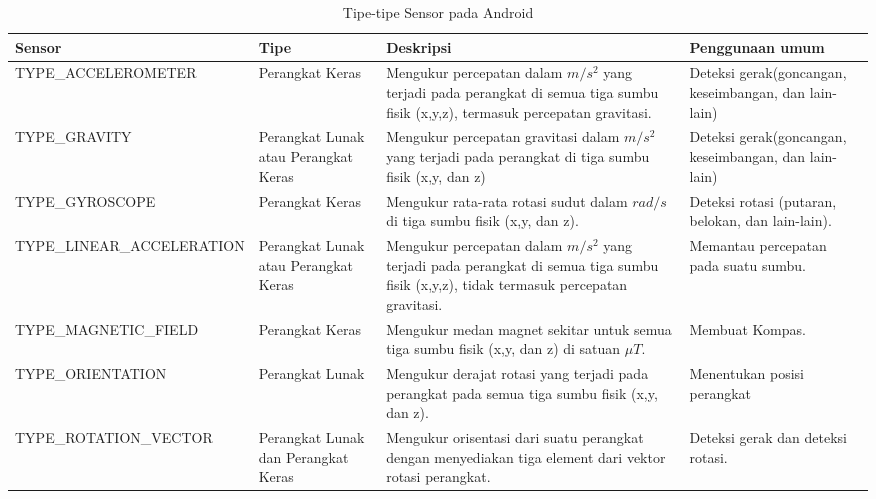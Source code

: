 \begin{table}[htbp]
	\centering
	\caption{Tipe-tipe Sensor pada Android}
\begin{tabular}{|p{6.3cm}| p{1.5cm}| p{5cm}| p{2.4cm}|} 
\hline
Sensor & Tipe & Deskripsi & Penggunaan umum\\ \hline
TYPE\_ACCELEROMETER & Perangkat Keras & Mengukur percepatan dalam \(m/s^2\) yang terjadi pada perangkat di semua tiga sumbu fisik (x,y,z), termasuk percepatan gravitasi. & Deteksi gerak(goncangan, keseimbangan, dan lain-lain)\\ \hline
TYPE\_GRAVITY & Perangkat Lunak atau Perangkat Keras & Mengukur percepatan gravitasi dalam \(m/s^2\) yang terjadi pada perangkat di tiga sumbu fisik (x,y, dan z) & Deteksi gerak(goncangan, keseimbangan, dan lain-lain)\\ \hline
TYPE\_GYROSCOPE & Perangkat Keras & Mengukur rata-rata rotasi sudut dalam \(rad/s\) di tiga sumbu fisik (x,y, dan z). & Deteksi rotasi (putaran, belokan, dan lain-lain).\\ \hline
TYPE\_LINEAR\_ACCELERATION & Perangkat Lunak atau Perangkat Keras & Mengukur percepatan dalam \(m/s^2\) yang terjadi pada perangkat di semua tiga sumbu fisik (x,y,z), tidak termasuk percepatan gravitasi. & Memantau percepatan pada suatu sumbu.\\ \hline
TYPE\_MAGNETIC\_FIELD & Perangkat Keras & Mengukur medan magnet sekitar untuk semua tiga sumbu fisik (x,y, dan z) di satuan \(\mu T\). & Membuat Kompas.\\ \hline
TYPE\_ORIENTATION & Perangkat Lunak & Mengukur derajat rotasi yang terjadi pada perangkat pada semua tiga sumbu fisik (x,y, dan z). & Menentukan posisi perangkat \\ \hline
TYPE\_ROTATION\_VECTOR & Perangkat Lunak dan Perangkat Keras & Mengukur orisentasi dari suatu perangkat dengan menyediakan tiga element dari vektor rotasi perangkat. & Deteksi gerak dan deteksi rotasi.\\ \hline
\end{tabular}
\end{table}
